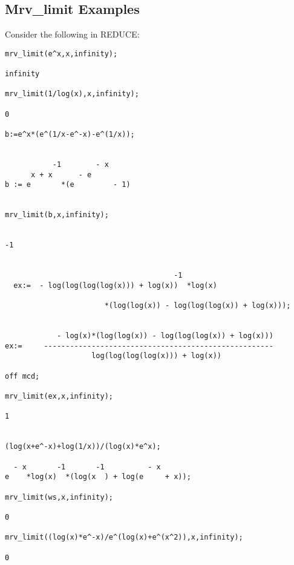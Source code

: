 \subsection{Mrv\_limit Examples}
Consider the following in \small{REDUCE}:
\begin{verbatim}
mrv_limit(e^x,x,infinity);

infinity

mrv_limit(1/log(x),x,infinity);

0

b:=e^x*(e^(1/x-e^-x)-e^(1/x));


           -1        - x
      x + x      - e
b := e       *(e         - 1)


mrv_limit(b,x,infinity);


-1


                                       -1
  ex:=  - log(log(log(log(x))) + log(x))  *log(x)

                       *(log(log(x)) - log(log(log(x)) + log(x)));


            - log(x)*(log(log(x)) - log(log(log(x)) + log(x)))
ex:=     -----------------------------------------------------
                    log(log(log(log(x))) + log(x))

off mcd;

mrv_limit(ex,x,infinity);

1


(log(x+e^-x)+log(1/x))/(log(x)*e^x);

  - x       -1       -1          - x
e    *log(x)  *(log(x  ) + log(e     + x));

mrv_limit(ws,x,infinity);

0

mrv_limit((log(x)*e^-x)/e^(log(x)+e^(x^2)),x,infinity);

0

\end{verbatim}
\normalsize
